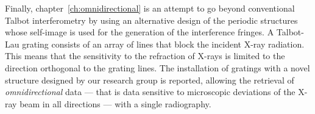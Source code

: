 Finally, chapter~\ref{ch:omnidirectional} is an attempt to go beyond
conventional Talbot interferometry by using an alternative design of the
periodic structures whose self-image is used for the generation of the
interference fringes. A Talbot-Lau grating consists of an array of lines that block the
incident X-ray radiation. This means that the sensitivity to the refraction
of X-rays is limited to the
direction orthogonal to
the grating lines. The installation of gratings with a novel structure
designed by our research group is
reported, allowing the retrieval of \emph{omnidirectional} data --- that is
data sensitive to microscopic deviations of the X-ray beam in all directions
--- with a single radiography.
